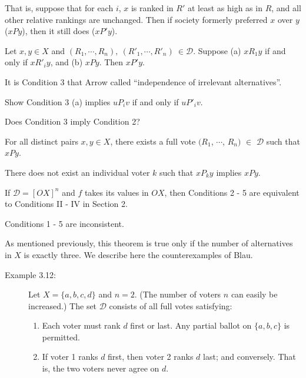 \documentclass{article}
\begin{document}
\begin{description}
  That is, suppose that for each $i$, $x$ is ranked in $R'$ at least as high as in $R$, and all other relative rankings are unchanged. Then if society formerly preferred $x$ over $y$ ($xPy$), then it still does ($xP'y$).

\item[Condition 3:] Let $x,y \in X$ and $(R_{1},\cdots,R_{n}),\ (R'_{1},\cdots,R'_{n}) \ \in \mathcal{D}$. Suppose (a) $xR_{1}y$ if and only if $xR'_{i}y$, and (b) $xPy$. Then $xP'y$.

  It is Condition 3 that Arrow called ``independence of irrelevant alternatives''.

\item[Exercise 3.8:] Show Condition 3 (a) implies $uP_{i}v$ if and only if $uP'_{i}v$.

\item[Question 3.9:] Does Condition 3 imply Condition 2?

\item[Condition 4:] For all distinct pairs $x,y \in X$, there exists a full vote $(R_{1}$, $\cdots$, $R_{n})$ $\in$ $\mathcal{D}$ such that $xPy$.

\item[Condition 5:] There does not exist an individual voter $k$ such that $xP_{k}y$ implies $xPy$.

\item[Exercise 3.10:] If $\mathcal{D} = [OX]^{n}$ and $f$ takes its values in $OX$, then Conditions 2 - 5 are equivalent to Conditions II - IV in Section 2.

\item[``Theorem'' 3.11 (Arrow):] Conditions 1 - 5 are inconsistent.

\end{description}

As mentioned previously, this theorem is true only if the number of alternatives in $X$ is exactly three. We describe here the counterexamples of Blau.

\begin{description}

\item[Example 3.12:] Let $X = \{ a, b, c, d \}$ and $n = 2$. (The number of voters $n$ can easily be increased.) The set $\mathcal{D}$ consists of all full votes satisfying:
  \begin{enumerate}[\hspace{1cm}(a)]
    \item Each voter must rank $d$ first or last. Any partial ballot on $\{ a, b, c \}$ is permitted.
    \item If voter 1 ranks $d$ first, then voter 2 ranks $d$ last; and conversely. That is, the two voters never agree on $d$.
  \end{enumerate}


\end{description}
\end{document}
